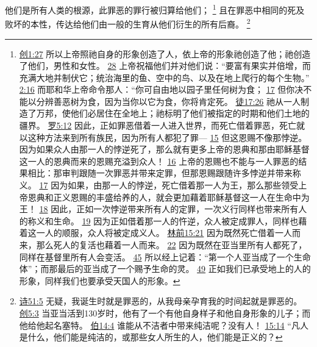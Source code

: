 \documentclass[12pt, a4paper, oneside]{ctexart}
\newcounter{parnum}[section]
\newcommand{\N}{%
   \noindent\refstepcounter{parnum}%
    \makebox[\parindent][l]{\textbf{\arabic{parnum}.}}}
\begin{document}
\N 他们是所有人类的根源，此罪恶的罪行被归算给他们；
	\footnote {
		\href{https://biblehub.com/genesis/1-27.htm}{创1:27} 所以上帝照祂自身的形象创造了人，依上帝的形象祂创造了他；祂创造了他们，男性和女性。
		\href{https://biblehub.com/genesis/1-28.htm}{28} 上帝祝福他们并对他们说：“要富有果实并倍增，而充满大地并制伏它；统治海里的鱼、空中的鸟、以及在地上爬行的每个生物。”
        \href{https://biblehub.com/genesis/2-16.htm}{2:16} 而耶和华上帝命令那人：“你可自由地以园子里任何树为食；
		\href{https://biblehub.com/genesis/2-17.htm}{17} 但你决不能以分辨善恶树为食，因为当你以它为食，你将肯定死。
		\href{https://biblehub.com/acts/17-26.htm}{徒17:26} 祂从一人制造了万邦，使他们必居住在全地上；祂标明了他们被指定的时期和他们土地的疆界。
		\href{https://biblehub.com/romans/5-12.htm}{罗5:12} 因此，正如罪恶借着一人进入世界，而死亡借着罪恶，死亡就以这种方法来到所有族民，因为所有人都犯了罪---
		\href{https://biblehub.com/romans/5-15.htm}{15} 但这恩赐不像那悖逆。因为如果众人由那一人的悖逆死了，那么就有更多上帝的恩典和那由耶稣基督这一人的恩典而来的恩赐充溢到众人！
		\href{https://biblehub.com/romans/5-16.htm}{16} 上帝的恩赐也不能与一人罪恶的结果相比：那审判跟随一次罪恶并带来定罪，但那恩赐跟随许多悖逆并带来称义。
		\href{https://biblehub.com/romans/5-17.htm}{17} 因为如果，由那一人的悖逆，死亡借着那一人为王，那么那些领受上帝恩典和正义恩赐的丰盛给养的人，就会更加藉着耶稣基督这一人在生命中为王！
		\href{https://biblehub.com/romans/5-18.htm}{18} 因此，正如一次悖逆带来所有人的定罪，一次义行同样也带来所有人的称义和生命。
		\href{https://biblehub.com/romans/5-19.htm}{19} 因为正如借着那一人的忤逆，众人被定成罪人，同样也藉着这一人的顺服，众人将被定成义人。
		\href{https://biblehub.com/1_corinthians/15-21.htm}{林前15:21} 因为既然死亡借着一人而来，那么死人的复活也藉着一人而来。
		\href{https://biblehub.com/1_corinthians/15-22.htm}{22} 因为既然在亚当里所有人都死了，同样在基督里所有人会变活。
		\href{https://biblehub.com/1_corinthians/15-45.htm}{45} 所以经上记着：“第一个人亚当成了一个生命体”；而那最后的亚当成了一个赐予生命的灵。
		\href{https://biblehub.com/1_corinthians/15-49.htm}{49} 正如我们已承受地上的人的形象，同样我们也要承受天国人的形象。
	}
	且在罪恶中相同的死及败坏的本性，传达给他们由一般的生育从他们衍生的所有后裔。
	\footnote {
		\href{https://biblehub.com/psalms/51-5.htm}{诗51:5} 无疑，我诞生时就是罪恶的，从我母亲孕育我的时间起就是罪恶的。
		\href{https://biblehub.com/genesis/5-3.htm}{创5:3} 当亚当活到130岁时，他有了一个有他自身样子和他自身形象的儿子；而他给他起名塞特。
		\href{https://biblehub.com/job/14-4.htm}{伯14:4} 谁能从不洁者中带来纯洁呢？没有人！
		\href{https://biblehub.com/job/15-14.htm}{15:14} “凡人是什么，他们能是纯洁的，或那些女人所生的人，他们能是正义的？
	}
\end{document}
